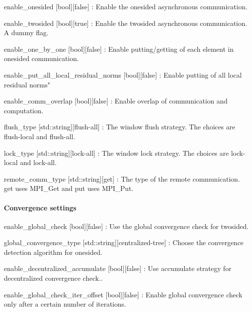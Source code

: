 \begin{DoxyItemize}
\item {\ttfamily enable\+\_\+onesided} \mbox{[}bool\mbox{]}\mbox{[}false\mbox{]} \+: Enable the onesided asynchronous communication.
\item {\ttfamily enable\+\_\+twosided} \mbox{[}bool\mbox{]}\mbox{[}true\mbox{]} \+: Enable the twosided asynchronous communication. A dummy flag.
\item {\ttfamily enable\+\_\+one\+\_\+by\+\_\+one} \mbox{[}bool\mbox{]}\mbox{[}false\mbox{]} \+: Enable putting/getting of each element in onesided communication.
\item {\ttfamily enable\+\_\+put\+\_\+all\+\_\+local\+\_\+residual\+\_\+norms} \mbox{[}bool\mbox{]}\mbox{[}false\mbox{]} \+: Enable putting of all local residual norms"
\item {\ttfamily enable\+\_\+comm\+\_\+overlap} \mbox{[}bool\mbox{]}\mbox{[}false\mbox{]} \+: Enable overlap of communication and computation.
\item {\ttfamily flush\+\_\+type} \mbox{[}std\+::string\mbox{]}\mbox{[}flush-\/all\mbox{]} \+: The window flush strategy. The choices are {\ttfamily flush-\/local} and {\ttfamily flush-\/all}.
\item {\ttfamily lock\+\_\+type} \mbox{[}std\+::string\mbox{]}\mbox{[}lock-\/all\mbox{]} \+: The window lock strategy. The choices are {\ttfamily lock-\/local} and {\ttfamily lock-\/all}.
\item {\ttfamily remote\+\_\+comm\+\_\+type} \mbox{[}std\+::string\mbox{]}\mbox{[}get\mbox{]} \+: The type of the remote communication. {\ttfamily get} uses {\ttfamily M\+P\+I\+\_\+\+Get} and {\ttfamily put} uses {\ttfamily M\+P\+I\+\_\+\+Put}.
\end{DoxyItemize}

\paragraph*{Convergence settings}


\begin{DoxyItemize}
\item {\ttfamily enable\+\_\+global\+\_\+check} \mbox{[}bool\mbox{]}\mbox{[}false\mbox{]} \+: Use the global convergence check for twosided.
\item {\ttfamily global\+\_\+convergence\+\_\+type} \mbox{[}std\+::string\mbox{]}\mbox{[}centralized-\/tree\mbox{]} \+: Choose the convergence detection algorithm for onesided.
\item {\ttfamily enable\+\_\+decentralized\+\_\+accumulate} \mbox{[}bool\mbox{]}\mbox{[}false\mbox{]} \+: Use accumulate strategy for decentralized convergence check..
\item {\ttfamily enable\+\_\+global\+\_\+check\+\_\+iter\+\_\+offset} \mbox{[}bool\mbox{]}\mbox{[}false\mbox{]} \+: Enable global convergence check only after a certain number of iterations.
\end{DoxyItemize}

